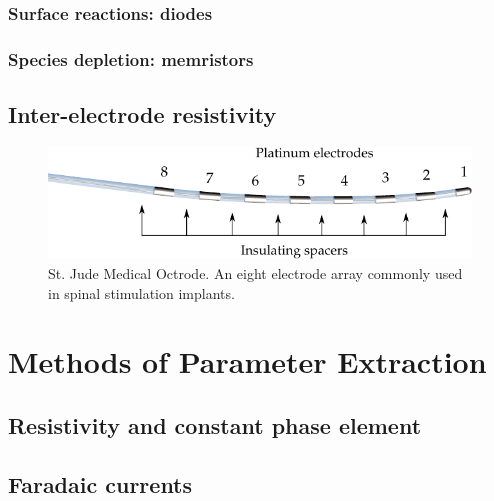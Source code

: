     \subsubsection{Surface reactions: diodes}
    \subsubsection{Species depletion: memristors}

  \subsection{Inter-electrode resistivity}
    \begin{figure}
      \centering
      \includegraphics{content/pt2/07-InterfaceModel/graphics/StJudeOctrodeDiagram}
      \caption{\label{fig:StJudeOctrode_Labelled}St. Jude Medical Octrode. An eight electrode array commonly used in spinal stimulation implants.}
    \end{figure}




\section{Methods of Parameter Extraction}
  \subsection{Resistivity and constant phase element}
  \subsection{Faradaic currents}


